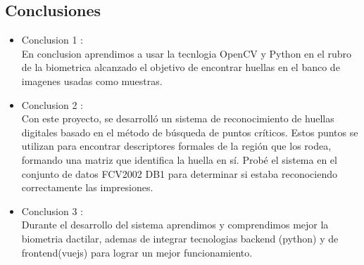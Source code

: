 \documentclass[preprint,12pt]{elsarticle}
\begin{document}
\begin{multicols}{2}
\section{Conclusiones}

\begin{itemize}

\item Conclusion 1 : \\
En conclusion aprendimos a usar la tecnlogia OpenCV y Python en el rubro de la biometrica alcanzado el objetivo de encontrar huellas en el banco de imagenes usadas como muestras.
\item Conclusion 2 : \\ 
Con este proyecto, se desarrolló un sistema de reconocimiento de huellas digitales basado en el método de búsqueda de puntos críticos. Estos puntos se utilizan para encontrar descriptores formales de la región que los rodea, formando una matriz que identifica la huella en sí. Probé el sistema en el conjunto de datos FCV2002 DB1 para determinar si estaba reconociendo correctamente las impresiones.
\item Conclusion 3 : \\ 
Durante el desarrollo del sistema aprendimos y comprendimos mejor la biometria dactilar, ademas de integrar tecnologias backend (python) y de frontend(vuejs) para lograr un mejor funcionamiento. 
\end{itemize}
\end{multicols}

	
	
\end{document}
